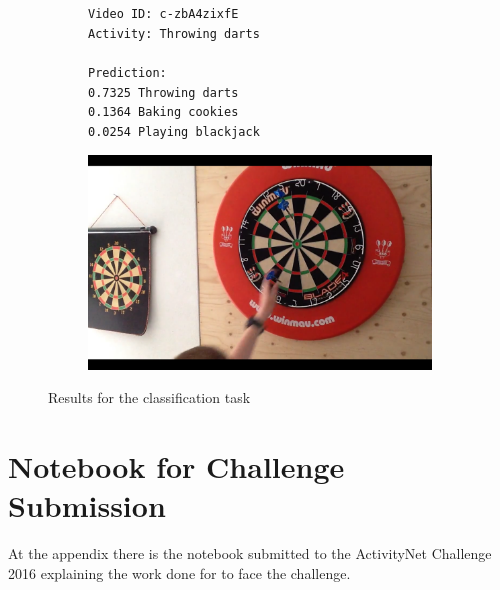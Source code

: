 \begin{figure}[H]
\centering
\begin{subfigure}[b]{.4\textwidth}
  \texttt{Video ID: c-zbA4zixfE \\
  Activity: Throwing darts \\
  \\
  Prediction: \\
  0.7325	Throwing darts \\
  0.1364	Baking cookies \\
  0.0254	Playing blackjack \\}
\end{subfigure}%
\begin{subfigure}[b]{.6\textwidth}
  \centering
\includegraphics[width=0.95\linewidth]{img/results/results_visualization_classification_5}
\end{subfigure}

\caption{Results for the classification task}
\label{fig:results_visualization_classification}
\end{figure}


\chapter{Notebook for Challenge Submission}

At the appendix there is the notebook submitted to the ActivityNet Challenge 2016 explaining the work done for to face the challenge.

